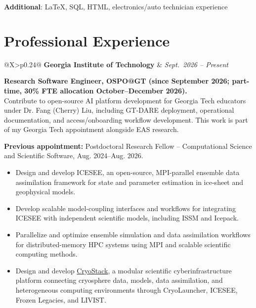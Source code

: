 \documentclass[11pt]{article}
\makeatletter
\newcommand{\cvitem}[2]{%
\textbf{#1}: #2\par
}
\newcommand{\entry}[4]{%
\Needspace{6\baselineskip}
\begin{tabularx}{\textwidth}{@{}X>{\raggedleft\arraybackslash}p{0.24\textwidth}@{}}
\textbf{#1} & \textit{#2} \\
\multicolumn{2}{@{}l@{}}{\textit{#3}}
\end{tabularx}
\vspace{0.2em}
#4
\vspace{0.8em}
}
\makeatother
\begin{document}
\cvitem{Additional}{\LaTeX, SQL, HTML, electronics/auto technician experience}
\endgroup


\section*{Professional Experience}

\entry{Georgia Institute of Technology}{Sept.\ 2026 -- Present}
{Research Scientist II}
{
\textbf{Research Software Engineer, OSPO@GT (since September 2026; part-time, 30\% FTE allocation October--December 2026).}\\Contribute to open-source AI platform development for Georgia Tech educators under Dr. Fang (Cherry) Liu, including GT-DARE deployment, operational documentation, and access/onboarding workflow development. This work is part of my Georgia Tech appointment alongside EAS research.

\textbf{Previous appointment:} Postdoctoral Research Fellow -- Computational Science and Scientific Software, Aug. 2024--Aug. 2026.

\begin{itemize}[leftmargin=1.2em, itemsep=2pt, topsep=2pt]

\item Design and develop ICESEE, an open-source, MPI-parallel ensemble data assimilation framework for state and parameter estimation in ice-sheet and geophysical models.

\item Develop scalable model-coupling interfaces and workflows for integrating ICESEE with independent scientific models, including ISSM and Icepack.

\item Parallelize and optimize ensemble simulation and data assimilation workflows for distributed-memory HPC systems using MPI and scalable scientific computing methods.

\item Design and develop \href{https://cryostack.eas.gatech.edu/}{CryoStack}, a modular scientific cyberinfrastructure platform connecting cryosphere data, models, data assimilation, and heterogeneous computing environments through CryoLauncher, ICESEE, Frozen Legacies, and LIVIST.


\end{itemize}}
\end{document}
